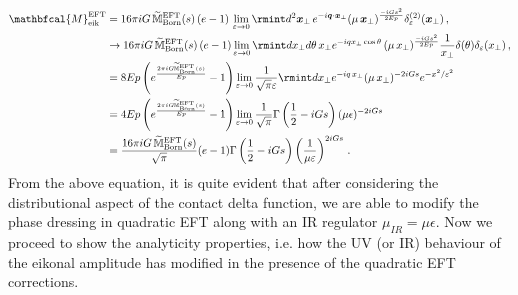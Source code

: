 \begin{align}
    \begin{split}
\mathbfcal{M}_{\textrm{eik}}^{\textrm{EFT}}&= {{16\pi i G\, \widetilde{\mathbb{M}}^{\textrm{EFT}}_{\textrm{Born}}(s)}} \left(e-1\right)\,\lim_{\varepsilon\to 0}\rmint  d^2 \boldsymbol{x}_{\perp}\,e^{-i \boldsymbol{q}\cdot \boldsymbol{x}_{\perp}}(\mu\,\boldsymbol{x}_{\perp})^{\frac{-i G s^2}{2Ep}}\delta_{\varepsilon}^{(2)}(\boldsymbol{x}_{\perp})\,,\\ &
        \rightarrow{16\pi i G\, \widetilde{\mathbb{M}}^{\textrm{EFT}}_{\textrm{Born}}(s)} \left(e-1\right)\lim_{\varepsilon\to 0}\rmint dx_{\perp}d\theta\,x_{\perp} e^{-i q  x_{\perp}\cos{\theta}}\,(\mu\,{x}_{\perp})^{\frac{-i G s^2}{2Ep}}\frac{1}{x_{\perp}}\delta(\theta)\delta_{\varepsilon}(x_{\perp})\,,\\ &
       =8Ep \left(e^{\frac{2\pi i G \widetilde{\mathbb{M}}^{\textrm{EFT}}_{\textrm{Born}}(s)}{Ep}}-1\right)\lim_{\varepsilon\to 0}\frac{1}{\sqrt{\pi}\varepsilon}\rmint dx_{\perp} e^{-i q\,x_{\perp}} (\mu\,{x}_{\perp})^{-2iGs} e^{-x^2/\varepsilon^2}\\ &
        =4Ep \left(e^{\frac{2\pi i G \widetilde{\mathbb{M}}^{\textrm{EFT}}_{\textrm{Born}}(s)}{Ep}}-1\right)\lim_{\varepsilon\to 0}\frac{1}{\sqrt{\pi}} \Gamma \left(\frac{1}{2}-i G s\right) (\mu  \epsilon )^{-2 i G s}\\ &
      =\frac{16\pi i G\, \widetilde{\mathbb{M}}^{\textrm{EFT}}_{\textrm{Born}}(s)} {\sqrt{\pi}}(e-1)\Gamma\left(\frac{1}{2}-i G s \right)\left(\frac{1}{\mu\varepsilon}\right)^{2iGs}\,.
    \end{split}
\end{align}
 {From the above equation, it is quite evident that after considering the distributional aspect of the contact delta function, we are able to modify the phase dressing in quadratic EFT along with an IR regulator $\mu_{IR}=\mu\epsilon$.}
Now we proceed to show the analyticity properties, i.e. how the UV (or IR) behaviour of the eikonal amplitude has modified in the presence of the quadratic EFT corrections.
